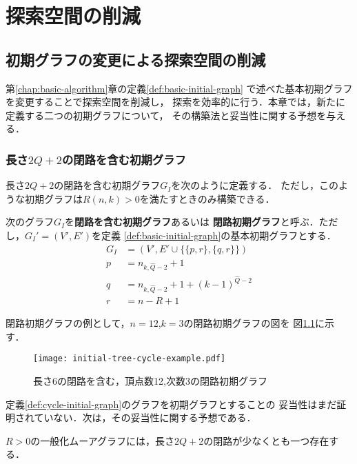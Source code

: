 
\chapter{探索空間の削減}
\label{chap:reduction}

\section{初期グラフの変更による探索空間の削減}
\label{sect:reduce-by-initial-graph}

第\ref{chap:basic-algorithm}章の定義\ref{def:basic-initial-graph}
で述べた基本初期グラフを変更することで探索空間を削減し，
探索を効率的に行う．本章では，新たに定義する二つの初期グラフについて，
その構築法と妥当性に関する予想を与える．

\subsection{長さ$2Q+2$の閉路を含む初期グラフ}
\label{subsect:initial-graph-cycle}
長さ$2Q+2$の閉路を含む初期グラフ$G_I$を次のように定義する．
ただし，このような初期グラフは$R(n,k)>0$を満たすときのみ構築できる．
\begin{definition}[長さ$2Q+2$の閉路を含む初期グラフ]\rm
  \label{def:cycle-initial-graph}
  次のグラフ$G_I$を\textbf{閉路を含む初期グラフ}あるいは
  \textbf{閉路初期グラフ}と呼ぶ．ただし，$G_I'=(V',E')$を定義
  \ref{def:basic-initial-graph}の基本初期グラフとする．
  \begin{equation}
    \begin{aligned}
      G_I&=(V',E'\cup\{\{p,r\},\{q,r\}\}) \\
      p&=n_{k,\hat{Q}-2}+1 \\
      q&=n_{k,\hat{Q}-2}+1+(k-1)^{\hat{Q}-2} \\
      r&=n-R+1
    \end{aligned}
  \end{equation}
\end{definition}
閉路初期グラフの例として，$n=12$,$k=3$の閉路初期グラフの図を
図\ref{fig:initial-graph-cycle-example}に示す．

\begin{figure}
  \centering
  \texttt{[image: initial-tree-cycle-example.pdf]}
  \caption{長さ6の閉路を含む，頂点数12,次数3の閉路初期グラフ}
  \label{fig:initial-graph-cycle-example}
\end{figure}

定義\ref{def:cycle-initial-graph}のグラフを初期グラフとすることの
妥当性はまだ証明されていない．次は，その妥当性に関する予想である．
\begin{conjecture}\rm
  \label{conj:gmg-cycle}
  $R>0$の一般化ムーアグラフには，長さ$2Q+2$の閉路が少なくとも一つ存在する．
\end{conjecture}

